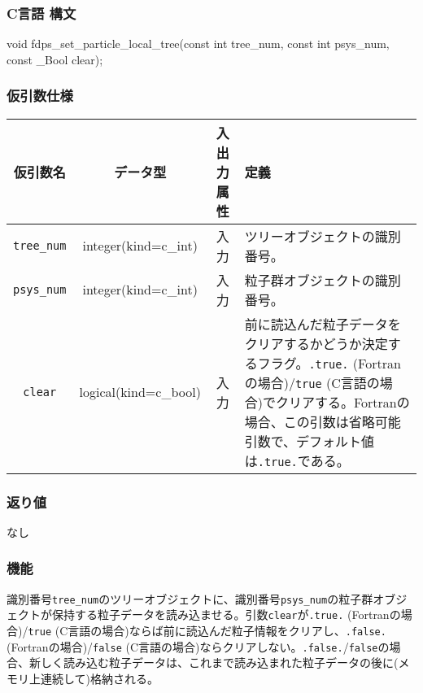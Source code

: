 \subsubsection*{C言語 構文}
\begin{screen}
\begin{spverbatim}  
void fdps_set_particle_local_tree(const int tree_num,                                               
                                  const int psys_num,                                               
                                  const _Bool clear);
\end{spverbatim}
\end{screen}

\subsubsection*{仮引数仕様}
\begin{table}[h]
\begin{tabularx}{\linewidth}{cccX}
\toprule
\rowcolor{Snow2}
仮引数名 & データ型 & 入出力属性 & 定義 \\
\midrule
\verb|tree_num| & integer(kind=c\_int) & 入力 & ツリーオブジェクトの識別番号。\\
\verb|psys_num| & integer(kind=c\_int) & 入力 & 粒子群オブジェクトの識別番号。\\
\verb|clear| & logical(kind=c\_bool) & 入力 & 前に読込んだ粒子データをクリアするかどうか決定するフラグ。\texttt{.true.} {\small (Fortranの場合)}/\texttt{true} {\small (C言語の場合)}でクリアする。Fortranの場合、この引数は省略可能引数で、デフォルト値は\texttt{.true.}である。\\
\bottomrule
\end{tabularx}
\end{table}


\subsubsection*{返り値}
なし

\subsubsection*{機能}
識別番号\texttt{tree\_num}のツリーオブジェクトに、識別番号\texttt{psys\_num}の粒子群オブジェクトが保持する粒子データを読み込ませる。引数\texttt{clear}が\texttt{.true.} {\small (Fortranの場合)}/\texttt{true} {\small (C言語の場合)}ならば前に読込んだ粒子情報をクリアし、\texttt{.false.} {\small (Fortranの場合)}/\texttt{false} {\small (C言語の場合)}ならクリアしない。\texttt{.false.}/\texttt{false}の場合、新しく読み込む粒子データは、これまで読み込まれた粒子データの後に(メモリ上連続して)格納される。

